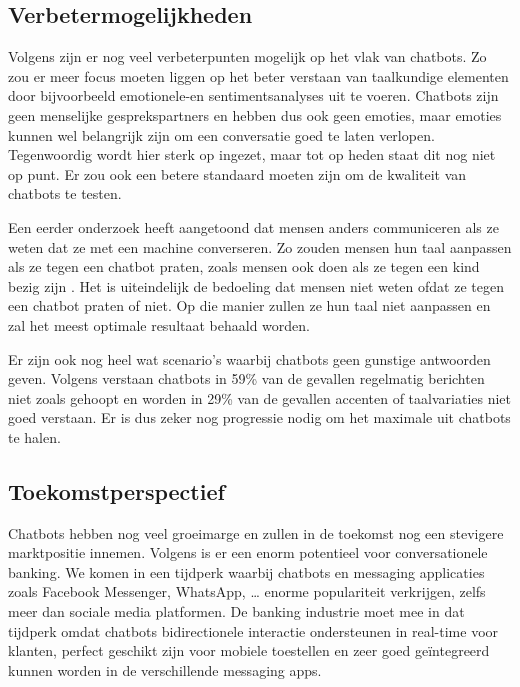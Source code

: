 \subsection{Verbetermogelijkheden}
\label{subsec:verbetermogelijkheden}

Volgens \textcite{Hussain2019} zijn er nog veel verbeterpunten mogelijk op het vlak van chatbots. Zo zou er meer focus moeten liggen op het beter verstaan van taalkundige elementen door bijvoorbeeld emotionele-en sentimentsanalyses uit te voeren. Chatbots zijn geen menselijke gesprekspartners en hebben dus ook geen emoties, maar emoties kunnen wel belangrijk zijn om een conversatie goed te laten verlopen. Tegenwoordig wordt hier sterk op ingezet, maar tot op heden staat dit nog niet op punt. Er zou ook een betere standaard moeten zijn om de kwaliteit van chatbots te testen.

Een eerder onderzoek heeft aangetoond dat mensen anders communiceren als ze weten dat ze met een machine converseren. Zo zouden mensen hun taal aanpassen als ze tegen een chatbot praten, zoals mensen ook doen als ze tegen een kind bezig zijn \autocite{Hill2015}. Het is uiteindelijk de bedoeling dat mensen niet weten ofdat ze tegen een chatbot praten of niet. Op die manier zullen ze hun taal niet aanpassen en zal het meest optimale resultaat behaald worden. 

Er zijn ook nog heel wat scenario’s waarbij chatbots geen gunstige antwoorden geven. Volgens \textcite{BRAIN2019} verstaan chatbots in 59\% van de gevallen regelmatig berichten niet zoals gehoopt en worden in 29\% van de gevallen accenten of taalvariaties niet goed verstaan. Er is dus zeker nog progressie nodig om het maximale uit chatbots te halen.

\subsection{Toekomstperspectief}
\label{subsec:toekomstperspectief}

Chatbots hebben nog veel groeimarge en zullen in de toekomst nog een stevigere marktpositie innemen. Volgens \textcite{Andreoli2017} is er een enorm potentieel voor conversationele banking. We komen in een tijdperk waarbij chatbots en messaging applicaties zoals Facebook Messenger, WhatsApp, … enorme populariteit verkrijgen, zelfs meer dan sociale media platformen. De banking industrie moet mee in dat tijdperk omdat chatbots bidirectionele interactie ondersteunen in real-time voor klanten, perfect geschikt zijn voor mobiele toestellen en zeer goed geïntegreerd kunnen worden in de verschillende messaging apps. 

